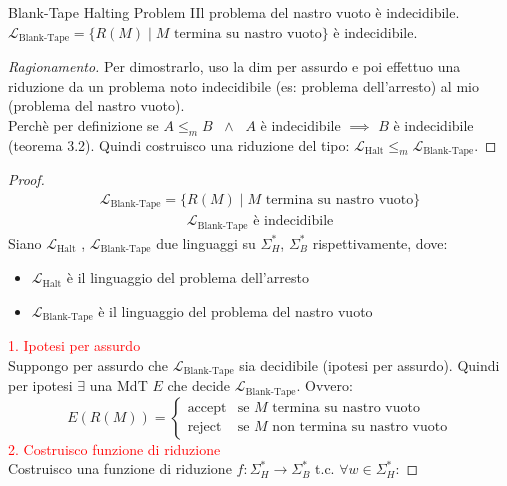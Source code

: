 \documentclass{article}  %
\theoremstyle{definition}
\newenvironment{ragionamento}[1][]
  {\begin{proof}[Ragionamento#1]\renewcommand{\qedsymbol}{}\normalfont}
  {\end{proof}}
\begin{document}
\begin{theorem}{Blank-Tape Halting Problem}
IIl problema del nastro vuoto è indecidibile. \\
$\mathcal{L}_{\text{Blank-Tape}} = \{R(M) \mid M \text{ termina su nastro vuoto}\}$ è indecidibile.
\footnotesize %
  \begin{ragionamento}
  Per dimostrarlo, uso la dim per assurdo e poi effettuo una riduzione da un problema noto indecidibile (es: problema dell'arresto) al mio (problema del nastro vuoto). \\
  Perchè per definizione se $A \leq_m B$ $\;\wedge\;$ $A$ è indecidibile $\implies$ $B$ è indecidibile (teorema 3.2).
  Quindi costruisco una riduzione del tipo: $\mathcal{L}_{\text{Halt}} \leq_m \mathcal{L}_{\text{Blank-Tape}}$.
  \end{ragionamento}
  \begin{proof}
    \begin{align*}
      \mathcal{L}_{\text{Blank-Tape}} = \{R(M) \mid M \text{ termina su nastro vuoto}\} \tag*{(ipotesi)}
    \end{align*}
    \begin{align*}
      \mathcal{L}_{\text{Blank-Tape}} \text{ è indecidibile} \tag*{(tesi)}
    \end{align*}
    Siano $\mathcal{L}_{\text{Halt}}$ , $\mathcal{L}_{\text{Blank-Tape}}$ due linguaggi su $\Sigma_H^*$, $\Sigma_B^*$ rispettivamente, dove:
    \begin{itemize}
      \item $\mathcal{L}_{\text{Halt}}$ è il linguaggio del problema dell'arresto
      \item $\mathcal{L}_{\text{Blank-Tape}}$ è il linguaggio del problema del nastro vuoto
    \end{itemize}
    \textcolor{red}{1. Ipotesi per assurdo} \\
    Suppongo per assurdo che $\mathcal{L}_{\text{Blank-Tape}}$ sia decidibile (ipotesi per assurdo). Quindi per ipotesi $\exists$ una MdT $E$ 
    che decide $\mathcal{L}_{\text{Blank-Tape}}$. Ovvero:
    \[
    E(R(M)) =
    \begin{cases}
      \text{accept} & \text{se } M \text{ termina su nastro vuoto} \\
      \text{reject} & \text{se } M \text{  non termina su nastro vuoto}
    \end{cases}
    \]
    \textcolor{red}{2. Costruisco funzione di riduzione} \\
    Costruisco una funzione di riduzione $f: \Sigma_H^* \rightarrow \Sigma_B^*$ t.c. $\forall{w} \in \Sigma_H^*$:

\end{proof}
\end{theorem}
\end{document}
